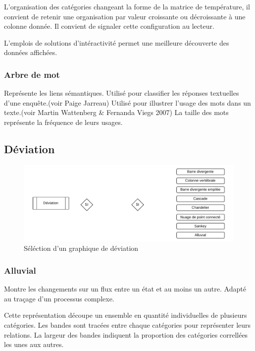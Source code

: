 \documentclass[a4paper,12pt]{article}
\begin{document}
\begin{multicols}{2}
L'organisation des catégories changeant la forme de la matrice de température, il convient de retenir une organisation par valeur croissante ou décroissante à une colonne donnée. Il convient de signaler cette configuration au lecteur. \autocite{wilkeVisualizingAmounts2019}

L'emplois de solutions d'intéractivité permet une meilleure découverte des données affichées.
\subsubsection*{Arbre de mot}
\label{sec:org30ddfef}
Représente les liens sémantiques. Utilisé pour classifier les réponses textuelles d'une enquête.(voir Paige Jarreau) Utilisé pour illustrer l'usage des mots dans un texte.(voir Martin Wattenberg \& Fernanda Viegs 2007) La taille des mots représente la fréquence de leurs usages. \autocite{jonathanschwabishQualitative2021}
\subsection*{Déviation}
\label{sec:org24efbb2}

\begin{figure}
\centering
\includegraphics[width=.9\linewidth]{./img/select-deviation.pdf}
\caption{\label{fig:select-deviation}Séléction d'un graphique de déviation}
\end{figure}
\subsubsection*{Alluvial}
\label{sec:org2074070}

Montre les changements sur un flux entre un état et au moins un autre. Adapté au traçage d'un processus complexe. \autocite{alansmithLexiqueVisuel}

Cette représentation découpe un ensemble en quantité individuelles de plusieurs catégories. Les bandes sont tracées entre chaque catégories pour représenter leurs relations. La largeur des bandes indiquent la proportion des catégories correllées les unes aux autres. \autocite{wilkeVisualizingNestedProportions2019}


\end{multicols}
\end{document}
